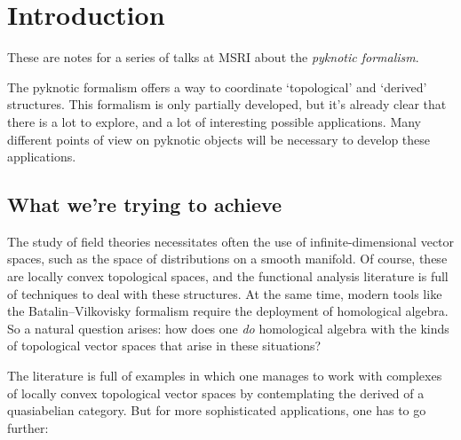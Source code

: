 
\section*{Introduction}

These are notes for a series of talks at MSRI about the \emph{pyknotic formalism}.

The pyknotic formalism offers a way to coordinate `topological' and `derived' structures.
This formalism is only partially developed, but it’s already clear that there is a lot to explore, and a lot of interesting possible applications.
Many different points of view on pyknotic objects will be necessary to develop these applications.

\subsection*{What we're trying to achieve}

\begin{exm*}
	The study of field theories necessitates often the use of infinite-dimensional vector spaces, such as the space of distributions on a smooth manifold.
	Of course, these are locally convex topological spaces, and the functional analysis literature is full of techniques to deal with these structures.
	At the same time, modern tools like the Batalin--Vilkovisky formalism require the deployment of homological algebra.
	So a natural question arises: how does one \emph{do} homological algebra with the kinds of topological vector spaces that arise in these situations?

	The literature is full of examples in which one manages to work with complexes of locally convex topological vector spaces by contemplating the derived \category of a quasiabelian category.
	But for more sophisticated applications, one has to go further:
\end{exm*}